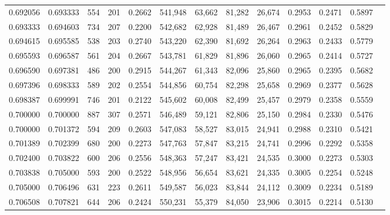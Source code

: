 \begin{tabular}{rrrrrrrrrrrrr}
0.692056 & 0.693333 &    554 &   201 &                                     0.2662 & 541,948 &  63,662 &  81,282 &  26,674 & 0.2953 & 0.2471 & 0.5897 \\
0.693333 & 0.694603 &    734 &   207 &                                     0.2200 & 542,682 &  62,928 &  81,489 &  26,467 & 0.2961 & 0.2452 & 0.5829 \\
0.694615 & 0.695585 &    538 &   203 &                                     0.2740 & 543,220 &  62,390 &  81,692 &  26,264 & 0.2963 & 0.2433 & 0.5779 \\
0.695593 & 0.696587 &    561 &   204 &                                     0.2667 & 543,781 &  61,829 &  81,896 &  26,060 & 0.2965 & 0.2414 & 0.5727 \\
0.696590 & 0.697381 &    486 &   200 &                                     0.2915 & 544,267 &  61,343 &  82,096 &  25,860 & 0.2965 & 0.2395 & 0.5682 \\
0.697396 & 0.698333 &    589 &   202 &                                     0.2554 & 544,856 &  60,754 &  82,298 &  25,658 & 0.2969 & 0.2377 & 0.5628 \\
0.698387 & 0.699991 &    746 &   201 &                                     0.2122 & 545,602 &  60,008 &  82,499 &  25,457 & 0.2979 & 0.2358 & 0.5559 \\
0.700000 & 0.700000 &    887 &   307 &                                     0.2571 & 546,489 &  59,121 &  82,806 &  25,150 & 0.2984 & 0.2330 & 0.5476 \\
0.700000 & 0.701372 &    594 &   209 &                                     0.2603 & 547,083 &  58,527 &  83,015 &  24,941 & 0.2988 & 0.2310 & 0.5421 \\
0.701389 & 0.702399 &    680 &   200 &                                     0.2273 & 547,763 &  57,847 &  83,215 &  24,741 & 0.2996 & 0.2292 & 0.5358 \\
0.702400 & 0.703822 &    600 &   206 &                                     0.2556 & 548,363 &  57,247 &  83,421 &  24,535 & 0.3000 & 0.2273 & 0.5303 \\
0.703838 & 0.705000 &    593 &   200 &                                     0.2522 & 548,956 &  56,654 &  83,621 &  24,335 & 0.3005 & 0.2254 & 0.5248 \\
0.705000 & 0.706496 &    631 &   223 &                                     0.2611 & 549,587 &  56,023 &  83,844 &  24,112 & 0.3009 & 0.2234 & 0.5189 \\
0.706508 & 0.707821 &    644 &   206 &                                     0.2424 & 550,231 &  55,379 &  84,050 &  23,906 & 0.3015 & 0.2214 & 0.5130 \\

\end{tabular}
